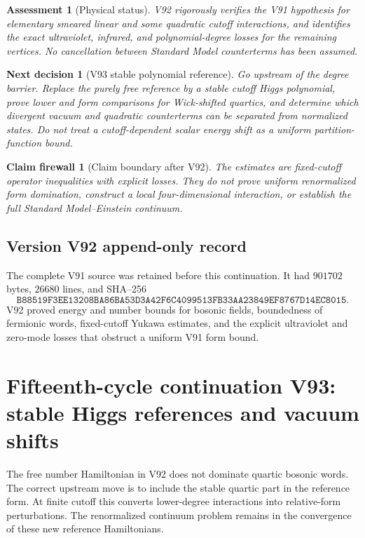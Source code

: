 \documentclass[11pt]{article}
\newtheorem{firewall}[theorem]{Claim firewall}
\newtheorem{decision}[theorem]{Next decision}
\newtheorem{assessment}[theorem]{Assessment}
\theoremstyle{remark}
\begin{document}
\begin{assessment}[Physical status]
\label{ass:v15v92-status}
V92 rigorously verifies the V91 hypothesis for elementary smeared
linear and some quadratic cutoff interactions, and identifies the
exact ultraviolet, infrared, and polynomial-degree losses for the
remaining vertices.  No cancellation between Standard Model
counterterms has been assumed.
\end{assessment}

\begin{decision}[V93 stable polynomial reference]
\label{dec:v15v92-next}
Go upstream of the degree barrier.  Replace the purely free
reference by a stable cutoff Higgs polynomial, prove lower and form
comparisons for Wick-shifted quartics, and determine which divergent
vacuum and quadratic counterterms can be separated from normalized
states.  Do not treat a cutoff-dependent scalar energy shift as a
uniform partition-function bound.
\end{decision}

\begin{firewall}[Claim boundary after V92]
\label{fire:v15v92}
The estimates are fixed-cutoff operator inequalities with explicit
losses.  They do not prove uniform renormalized form domination,
construct a local four-dimensional interaction, or establish the
full Standard Model--Einstein continuum.
\end{firewall}

\section*{Version V92 append-only record}
The complete V91 source was retained before this continuation.  It
had \(901702\) bytes, \(26680\) lines, and SHA--256
\[
 \texttt{B88519F3EE13208BA86BA53D3A42F6C4099513FB33AA23849EF8767D14EC8015}.
\]
V92 proved energy and number bounds for bosonic fields, boundedness
of fermionic words, fixed-cutoff Yukawa estimates, and the explicit
ultraviolet and zero-mode losses that obstruct a uniform V91 form
bound.
\chapter{Fifteenth-cycle continuation V93: stable Higgs references and vacuum shifts}
\label{sec:v15v93}

The free number Hamiltonian in V92 does not dominate quartic
bosonic words.  The correct upstream move is to include the stable
quartic part in the reference form.  At finite cutoff this converts
lower-degree interactions into relative-form perturbations.  The
renormalized continuum problem remains in the convergence of these
new reference Hamiltonians.
\end{document}
